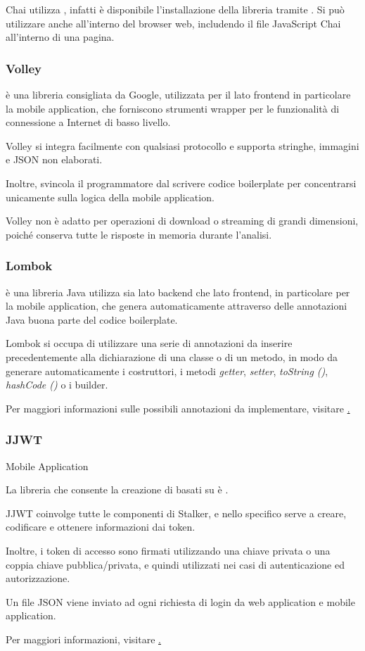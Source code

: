 \documentclass[../../../manuale-sviluppatore.tex]{subfiles}
\begin{document}
Chai utilizza , infatti è disponibile l'installazione della libreria tramite . Si può utilizzare anche all'interno del browser web, includendo il file JavaScript Chai all'interno di una pagina.

\subsubsection{Volley}%
\label{subs:volley}

 è una libreria consigliata da Google, utilizzata per il lato frontend in particolare la mobile application, che forniscono strumenti wrapper per le funzionalità di connessione a Internet di basso livello.

Volley si integra facilmente con qualsiasi protocollo e supporta stringhe, immagini e JSON non elaborati.

Inoltre, svincola il programmatore dal scrivere codice boilerplate per concentrarsi unicamente sulla logica della mobile application.

Volley non è adatto per operazioni di download o streaming di grandi dimensioni, poiché conserva tutte le risposte in memoria durante l'analisi.

\subsubsection{Lombok}%
\label{subs:lombok}

 è una libreria Java utilizza sia lato backend che lato frontend, in particolare per la mobile application, che genera automaticamente attraverso delle annotazioni Java buona parte del codice boilerplate.

Lombok si occupa di utilizzare una serie di annotazioni da inserire precedentemente alla dichiarazione di una classe o di un metodo, in modo da generare automaticamente i costruttori, i metodi \textit{getter}, \textit{setter}, \textit{toString ()}, \textit{hashCode ()} o i builder.

Per maggiori informazioni sulle possibili annotazioni da implementare, visitare \href{https://projectlombok.org/features/all}.

\subsubsection{JJWT}%
\label{subs:jjwt}
Mobile Application

La libreria che consente la creazione di  basati su  è .

JJWT coinvolge tutte le componenti di Stalker, e nello specifico serve a creare, codificare e ottenere informazioni dai token.

Inoltre, i token di accesso sono firmati utilizzando una chiave privata o una coppia chiave pubblica/privata, e quindi utilizzati nei casi di autenticazione ed autorizzazione.

Un file JSON viene inviato ad ogni richiesta di login da web application e mobile application.

Per maggiori informazioni, visitare \href{https://github.com/jwtk/jjwt}.
\end{document}
